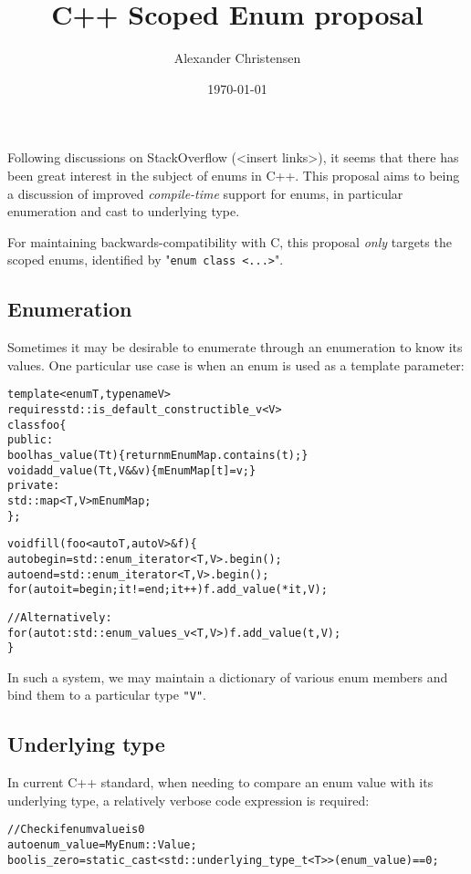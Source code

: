 \documentclass[a4paper]{article}
\title{C++ Scoped Enum proposal}
\author{\small Alexander Christensen}
\date{\vspace{-2mm}\small \today}
\begin{document}
\maketitle

Following discussions on StackOverflow (<insert links>), it seems that there has
been great interest in the subject of enums in C++. This proposal aims to being
a discussion of improved \textit{compile-time} support for enums, in particular
enumeration and cast to underlying type.

For maintaining backwards-compatibility with C, this proposal \textit{only}
targets the scoped enums, identified by "\texttt{enum class <...>}".


\subsection{Enumeration}

Sometimes it may be desirable to enumerate through an enumeration to know its
values. One particular use case is when an enum is used as a template parameter:

\begin{alltt}\footnotesize
template<enum T, typename V>
requires std::is\_default\_constructible\_v<V>
class foo \{
public:
  bool has\_value(T t) \{ return mEnumMap.contains(t); \}
  void add\_value(T t, V&& v) \{ mEnumMap[t] = v; \}
private:
  std::map<T, V> mEnumMap;
\};

void fill(foo<auto T, auto V>& f) \{
  auto begin = std::enum\_iterator<T, V>.begin();
  auto end = std::enum\_iterator<T, V>.begin();
  for (auto it = begin; it != end; it++) { f.add\_value(*it, V{}); }

  // Alternatively:
  for (auto t : std::enum\_values\_v<T, V>) { f.add\_value(t, V{}); }
\}
\end{alltt}

In such a system, we may maintain a dictionary of various enum members and bind
them to a particular type \texttt{"V"}.

\subsection{Underlying type}

In current C++ standard, when needing to compare an enum value with its
underlying type, a relatively verbose code expression is required:

\begin{alltt}\footnotesize
// Check if enum value is 0
auto enum\_value = MyEnum::Value;
bool is\_zero = static\_cast<std::underlying\_type\_t<T>>(enum\_value) == 0;
\end{alltt}
\end{document}
